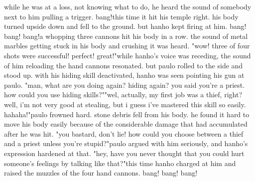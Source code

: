 while he was at a loss, not knowing what to do, he heard the sound of somebody next to him pulling a trigger.
bang!this time it hit his temple right.
 his body turned upside down and fell to the ground.
 but hanho kept firing at him.
bang! bang! bang!a whopping three cannons hit his body in a row.
 the sound of metal marbles getting stuck in his body and crushing it was heard.
 "wow! three of four shots were successful! perfect! great!"while hanho's voice was receding, the sound of him reloading the hand cannons resonated.
 but paulo rolled to the side and stood up.
with his hiding skill deactivated, hanho was seen pointing his gun at paulo.
"man, what are you doing again? hiding again? you said you're a priest.
 how could you use hiding skills?""wel, actually, my first job was a thief, right? well, i'm not very good at stealing, but i guess i've mastered this skill so easily.
 hahaha!"paulo frowned hard.
 stone debris fell from his body.
 he found it hard to move his body easily because of the considerable damage that had accumulated after he was hit.
 "you bastard, don't lie! how could you choose between a thief and a priest unless you're stupid?"paulo argued with him seriously, and hanho's expression hardened at that.
"hey, have you never thought that you could hurt someone's feelings by talking like that?"this time hanho charged at him and raised the muzzles of the four hand cannons.
bang! bang! bang!

 